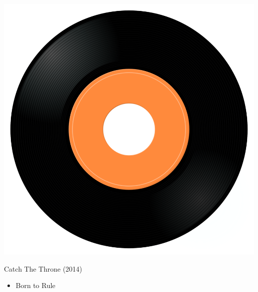 \begin{minipage}[t]{0.25\textwidth}\vspace{0pt}
\captionsetup{type=figure}
\includegraphics[width=\textwidth]{Images/cover.png}
\caption*{Catch The Throne (2014)}
\end{minipage}
\begin{minipage}[t]{0.25\textwidth}\vspace{0pt}
\begin{itemize}[nosep,leftmargin=1em,labelwidth=*,align=left]
	\setlength{\itemsep}{0pt}
	\item Born to Rule
\end{itemize}
\end{minipage}
